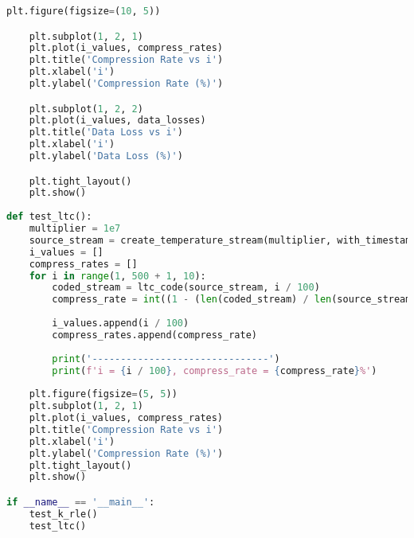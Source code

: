 \begin{lstlisting}[language=python, caption=Исходный код для тестирования алгоритмов, captionpos=b, frame=single]
    plt.figure(figsize=(10, 5))

    plt.subplot(1, 2, 1)
    plt.plot(i_values, compress_rates)
    plt.title('Compression Rate vs i')
    plt.xlabel('i')
    plt.ylabel('Compression Rate (%)')

    plt.subplot(1, 2, 2)
    plt.plot(i_values, data_losses)
    plt.title('Data Loss vs i')
    plt.xlabel('i')
    plt.ylabel('Data Loss (%)')

    plt.tight_layout()
    plt.show()    
    
def test_ltc():
    multiplier = 1e7
    source_stream = create_temperature_stream(multiplier, with_timestamps=True)
    i_values = []
    compress_rates = []
    for i in range(1, 500 + 1, 10):
        coded_stream = ltc_code(source_stream, i / 100)
        compress_rate = int((1 - (len(coded_stream) / len(source_stream))) * 100)
        
        i_values.append(i / 100)
        compress_rates.append(compress_rate)
        
        print('-------------------------------')
        print(f'i = {i / 100}, compress_rate = {compress_rate}%')
        
    plt.figure(figsize=(5, 5))
    plt.subplot(1, 2, 1)
    plt.plot(i_values, compress_rates)
    plt.title('Compression Rate vs i')
    plt.xlabel('i')
    plt.ylabel('Compression Rate (%)')
    plt.tight_layout()
    plt.show()   

if __name__ == '__main__':
    test_k_rle()
    test_ltc()
\end{lstlisting}

\endinput
